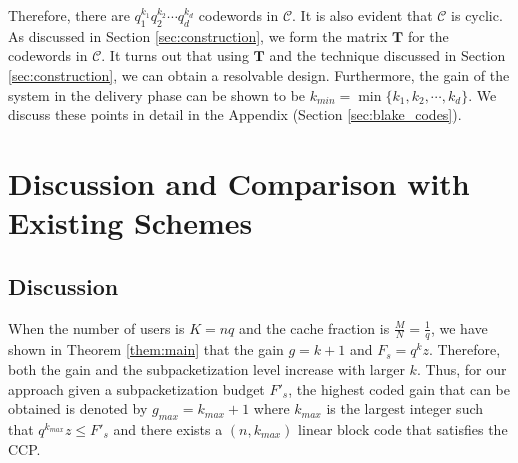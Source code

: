 \documentclass[journal,twocolumn]{IEEEtran}
\theoremstyle{definition}
\newcommand{\calC}{\mathcal{C}}
\newcommand{\bfT}{\mathbf{T}}
\newcommand{\aditya}[1]{\marginpar{+}{\bf Aditya's remark}: {\em #1}}
\begin{document}
Therefore, there are $q_1^{k_1}q_2^{k_2}\cdots q_d^{k_d}$ codewords in $\calC$. It is also evident that $\calC$ is cyclic.
As discussed in Section \ref{sec:construction}, we form the matrix $\bfT$ for the codewords in $\calC$. It turns out that using $\bfT$ and the technique discussed in Section \ref{sec:construction}, we can obtain a resolvable design. Furthermore, the gain of the system in the delivery phase can be shown to be $k_{min}=\min\{k_1,k_2,\cdots,k_d\}$. We discuss these points in detail in the Appendix (Section \ref{sec:blake_codes}).


\section{Discussion and Comparison with Existing Schemes}
\label{sec:compare}
\subsection{Discussion}



When the number of users is $K=nq$ and the cache fraction is $\frac{M}{N}=\frac{1}{q}$, we have shown in Theorem \ref{them:main} that the gain $g=k+1$ and $F_s=q^kz$. Therefore, both the gain and the subpacketization level increase with larger $k$. Thus, for our approach given a subpacketization budget $F'_s$, the highest coded gain that can be obtained is denoted by $g_{max}=k_{max}+1$ where $k_{max}$ is the largest integer such that $q^{k_{max}}z\le F'_s$ and there exists a $(n,k_{max})$ linear block code that satisfies the CCP.
\end{document}
